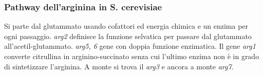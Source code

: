 \subsubsection{Pathway dell'arginina in S. cerevisiae}
Si parte dal glutammato usando cofattori ed energia chimica e un enzima per ogni passaggio. \emph{arg2} definisce la funzione selvatica per passare dal glutammato 
all'acetil-glutammato. \emph{arg5, 6} gene con doppia funzione enzimatica. Il gene \emph{arg1} converte citrullina in arginino-succinato senza cui l'ultimo enzima non \`e in grado 
di sintetizzare l'arginina. A monte si trova il \emph{arg3} e ancora a monte \emph{arg7}. 
